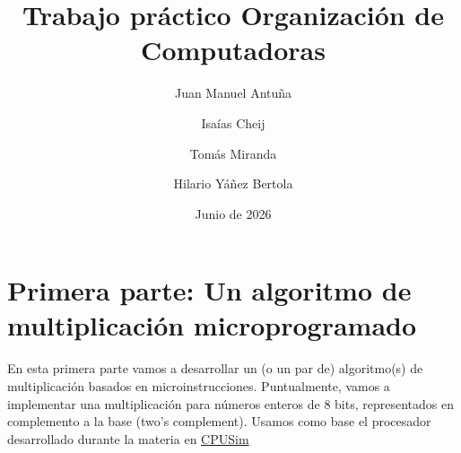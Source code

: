 \documentclass[11pt]{article}
\title{Trabajo práctico Organización de Computadoras}
\author{Juan Manuel Antuña \and Isaías Cheij \and Tomás Miranda \and Hilario Yáñez Bertola}
\date{Junio de 2026}
\begin{document}
    \maketitle
    \newpage

    \section{Primera parte: Un algoritmo de multiplicación microprogramado}

    En esta primera parte vamos a desarrollar un (o un par de) algoritmo(s) de multiplicación basados en microinstrucciones.
    Puntualmente, vamos a implementar una multiplicación para números enteros de 8 bits, representados en complemento a la base (two's complement).
    Usamos como base el procesador desarrollado durante la materia en \href{https://www.cs.colby.edu/djskrien/CPUSim/}{CPUSim}
\end{document}
